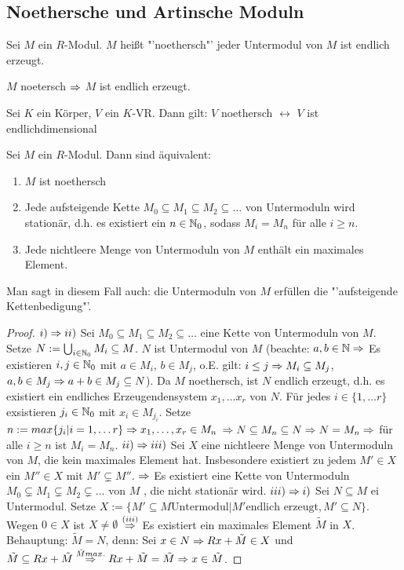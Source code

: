 \subsection{Noethersche und Artinsche Moduln}
\begin{df}
	Sei $M$ ein $R$-Modul. $M$ heißt "'noethersch"'  jeder Untermodul von $M$ ist endlich erzeugt.
\end{df}
\begin{anm}
	$M$ noetersch $\Rightarrow $ $M$ ist endlich erzeugt.
\end{anm}
\begin{bsp}
	Sei $K$ ein Körper, $V$ ein $K$-VR. Dann gilt: $V$ noethersch $\longleftrightarrow$ $V$ ist endlichdimensional
\end{bsp}
\begin{sa}
	Sei $M$ ein $R$-Modul. Dann sind äquivalent:
	\begin{enumerate}[label= \roman*)]
		\item $M$ ist noethersch
		\item Jede aufsteigende Kette $M_0 \subseteq M_1 \subseteq M_2 \subseteq \dots $ von Untermoduln wird stationär, d.h. es existiert ein $ n \in \mathbb{N}_0$, sodass $M_i = M_n$ für alle $i \geq n $.
		\item Jede nichtleere Menge von Untermoduln von $M$ enthält ein maximales Element.
	\end{enumerate}
	Man sagt in diesem Fall auch: die Untermoduln von $M$ erfüllen die "'aufsteigende Kettenbedigung"'.
\end{sa}
	\begin{proof} 
		$i) \Rightarrow ii)$ Sei $M_0 \subseteq M_1 \subseteq M_2 \subseteq \dots $ eine Kette von Untermoduln von $M$. Setze $N := \bigcup_{i \in \mathbb{N}_0} M_i \subseteq M$. $N$ ist Untermodul von $M$ (beachte: $ a,b \in \mathbb{N} \Rightarrow $ Es existieren $i,j \in \mathbb{N}_0$ mit $a \in M_i$, $b \in M_j$, o.E. gilt: $i\leq j \Rightarrow M_i \subseteq M_j$, $a,b \in M_j \Rightarrow a+b \in M_j \subseteq N$). Da $M$ noethersch, ist $N$ endlich erzeugt, d.h. es existiert ein endliches Erzeugendensystem $x_1, \dots x_r$ von $N$. Für jedes $i \in \{1,\dots r\} $ exsistieren $j_i \in \mathbb{N}_0 $ mit $x_i \in M_{j_i}$. Setze $n:= max\{j_i|i = 1, \dots r \} \Rightarrow x_1,\dots, x_r \in M_n$ $ \Rightarrow N \subseteq M_n \subseteq N \Rightarrow N = M_n \Rightarrow $ für alle $i \geq n $ ist $ M _i=M_n$.
		$ii) \Rightarrow iii)$ Sei $X$ eine nichtleere Menge von Untermoduln von $M$, die kein maximales Element hat. Insbesondere existiert zu jedem $ M' \in X $ ein $M'' \in X $ mit $M' \subsetneq M''$. $\Rightarrow$ Es existiert eine Kette von Untermoduln $M_0 \subsetneq M_1 \subsetneq M_2 \subsetneq \dots $ von $M$ , die nicht stationär wird.
		$iii) \Rightarrow i)$ Sei $N \subseteq M $ ei Untermodul. Setze $X := \{M' \subseteq M \text{Untermodul}| M' \text{endlich erzeugt}, M' \subseteq N\}$. Wegen $0 \in X$ ist $X \neq \emptyset $ $\overset{(iii)}{\Rightarrow}$ Es existiert ein maximales Element $\tilde{M} $ in $X$. \\
		Behauptung: $\tilde{M} = N$, denn: Sei $ x \in N \Rightarrow Rx+\tilde{M} \in X $ und $ \tilde{M} \subseteq Rx+\tilde{M} \overset{\tilde{M} max.}{\Rightarrow} Rx+\tilde{M} = \tilde{M} \Rightarrow x \in \tilde{M}$.
	\end{proof}
